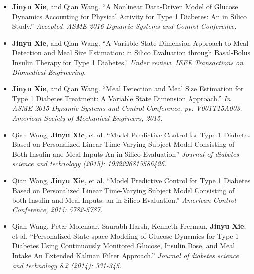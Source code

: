 \documentclass[10pt,a4paper]{article}
\begin{document}
\spacedhrule{0.5em}{-0.8em}
  
  \begin{itemize}
  \item \textbf{Jinyu Xie}, and Qian Wang. ``A Nonlinear Data-Driven Model of
    Glucose Dynamics Accounting for Physical Activity for Type 1 Diabetes: An in
    Silico Study.'' \textit{Accepted. ASME 2016 Dynamic Systems and Control
    Conference.} 
  \item \textbf{Jinyu Xie}, and Qian Wang. ``A Variable State Dimension Approach
    to Meal Detection and Meal Size Estimation: in Silico Evaluation through
    Basal-Bolus Insulin Therapy for Type 1 Diabetes.'' \textit{Under review. IEEE
    Transactions on Biomedical Engineering.}
  \item \textbf{Jinyu Xie}, and Qian Wang. ``Meal Detection and Meal Size Estimation for Type 1 Diabetes Treatment: A Variable State Dimension Approach.'' \textit{In ASME 2015 Dynamic Systems and Control Conference, pp. V001T15A003. American Society of Mechanical Engineers, 2015.}
  \item Qian Wang, \textbf{Jinyu Xie}, et al. ``Model Predictive Control for Type 1 Diabetes Based on Personalized Linear Time-Varying Subject Model Consisting of Both Insulin and Meal Inputs An in Silico Evaluation'' \textit{Journal of diabetes science and technology (2015): 1932296815586426.}
  \item Qian Wang, \textbf{Jinyu Xie}, et al. ``Model Predictive Control for Type 1 Diabetes Based on Personalized Linear Time-Varying Subject Model Consisting of both Insulin and Meal Inputs: an in Silico Evaluation.'' \textit{American Control Conference, 2015: 5782-5787.}
  \item Qian Wang, Peter Molenaar, Saurabh Harsh, Kenneth Freeman, \textbf{Jinyu Xie}, et al. ``Personalized State-space Modeling of Glucose Dynamics for Type 1 Diabetes Using Continuously Monitored Glucose, Insulin Dose, and Meal Intake An Extended Kalman Filter Approach.'' \textit{Journal of diabetes science and technology 8.2 (2014): 331-345.}
  \end{itemize}
  
  
\end{document}
